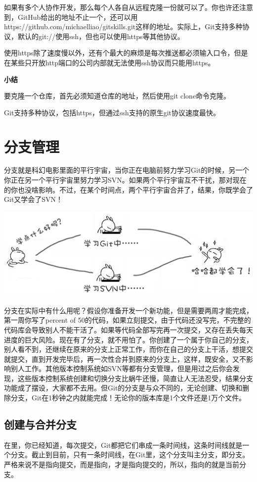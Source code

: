 \documentclass[•]{article}
\begin{document}
\begin{CJK}{UTF8}{gbsn}
\qquad 如果有多个人协作开发，那么每个人各自从远程克隆一份就可以了。你也许还注意到，GitHub给出的地址不止一个，还可以用https://github.com/michaelliao/gitskills.git这样的地址。实际上，Git支持多种协议，默认的git://使用ssh，但也可以使用https等其他协议。

使用https除了速度慢以外，还有个最大的麻烦是每次推送都必须输入口令，但是在某些只开放http端口的公司内部就无法使用ssh协议而只能用https。

\textbf{小结}

要克隆一个仓库，首先必须知道仓库的地址，然后使用git clone命令克隆。

Git支持多种协议，包括https，但通过ssh支持的原生git协议速度最快。

\section{分支管理}
\qquad 分支就是科幻电影里面的平行宇宙，当你正在电脑前努力学习Git的时候，另一个你正在另一个平行宇宙里努力学习SVN。如果两个平行宇宙互不干扰，那对现在的你也没啥影响。不过，在某个时间点，两个平行宇宙合并了，结果，你既学会了Git又学会了SVN！
\begin{center}
\includegraphics[scale=0.6]{study_git.png}
\end{center}
\qquad 分支在实际中有什么用呢？假设你准备开发一个新功能，但是需要两周才能完成，第一周你写了percent of 50的代码，如果立刻提交，由于代码还没写完，不完整的代码库会导致别人不能干活了。如果等代码全部写完再一次提交，又存在丢失每天进度的巨大风险。现在有了分支，就不用怕了。你创建了一个属于你自己的分支，别人看不到，还继续在原来的分支上正常工作，而你在自己的分支上干活，想提交就提交，直到开发完毕后，再一次性合并到原来的分支上，这样，既安全，又不影响别人工作。其他版本控制系统如SVN等都有分支管理，但是用过之后你会发现，这些版本控制系统创建和切换分支比蜗牛还慢，简直让人无法忍受，结果分支功能成了摆设，大家都不去用。但Git的分支是与众不同的，无论创建、切换和删除分支，Git在1秒钟之内就能完成！无论你的版本库是1个文件还是1万个文件。
\subsection{创建与合并分支}
\qquad 在{\color{blue}{版本回退}}里，你已经知道，每次提交，Git都把它们串成一条时间线，这条时间线就是一个分支。截止到目前，只有一条时间线，在Git里，这个分支叫主分支，即分支。严格来说不是指向提交，而是指向，才是指向提交的，所以，指向的就是当前分支。


\end{CJK}
\end{document}
